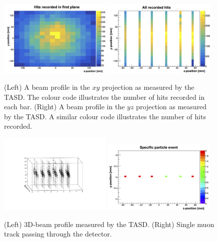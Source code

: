 \begin{figure}[h!]
\centering
\includegraphics[width=0.48\textwidth]{figures/nuphys/newFigures/beamXYplane1Hadron2.png}
\includegraphics[width=0.48\textwidth]{figures/nuphys/newFigures/beamYZhadron2.png}
\caption{(Left) A beam profile in the $xy$ projection as measured by the TASD. The colour code illustrates the number of hits recorded in each bar. (Right) A beam profile in the $yz$ projection as measured by the TASD. A similar colour code illustrates the number of hits recorded.}
\label{fig:TASDres2}
\end{figure}

\begin{figure}[h!]
\centering
\includegraphics[width=0.48\textwidth,trim = 5cm 5cm 5cm 5cm]{figures/nuphys/newFigures/beamPlot.pdf}
\includegraphics[width=0.48\textwidth]{figures/nuphys/newFigures/muonTrackYZ2.png}
\caption{(Left) 3D-beam profile measured by the TASD. (Right) Single muon track passing through the detector.}
\label{fig:TASDres1}
\end{figure}

